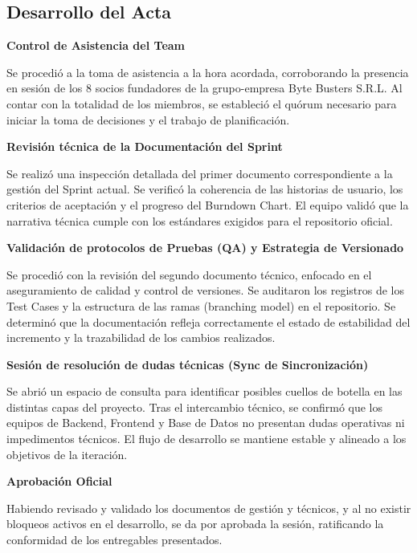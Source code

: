 \newpage
\subsection{Desarrollo del Acta}

\noindent \textbf{Control de Asistencia del Team}\par
Se procedió a la toma de asistencia a la hora acordada, corroborando la presencia en sesión de los 8 socios fundadores de la grupo-empresa Byte Busters S.R.L. Al contar con la totalidad de los miembros, se estableció el quórum necesario para iniciar la toma de decisiones y el trabajo de planificación.

\vspace*{0.5cm}
\noindent \textbf{Revisión técnica de la Documentación del Sprint}\par
Se realizó una inspección detallada del primer documento correspondiente a la gestión del Sprint actual. Se verificó la coherencia de las historias de usuario, los criterios de aceptación y el progreso del Burndown Chart. El equipo validó que la narrativa técnica cumple con los estándares exigidos para el repositorio oficial.

\vspace*{0.5cm}
\noindent \textbf{Validación de protocolos de Pruebas (QA) y Estrategia de Versionado}\par
Se procedió con la revisión del segundo documento técnico, enfocado en el aseguramiento de calidad y control de versiones. Se auditaron los registros de los Test Cases y la estructura de las ramas (branching model) en el repositorio. Se determinó que la documentación refleja correctamente el estado de estabilidad del incremento y la trazabilidad de los cambios realizados.

\vspace*{0.5cm}
\noindent \textbf{Sesión de resolución de dudas técnicas (Sync de Sincronización)}\par
Se abrió un espacio de consulta para identificar posibles cuellos de botella en las distintas capas del proyecto. Tras el intercambio técnico, se confirmó que los equipos de Backend, Frontend y Base de Datos no presentan dudas operativas ni impedimentos técnicos. El flujo de desarrollo se mantiene estable y alineado a los objetivos de la iteración.

\vspace*{0.5cm}
\noindent \textbf{Aprobación Oficial}\par
Habiendo revisado y validado los documentos de gestión y técnicos, y al no existir bloqueos activos en el desarrollo, se da por aprobada la sesión, ratificando la conformidad de los entregables presentados.

